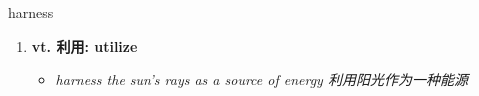 
\begin{frame}
{\huge harness}
\begin{center}
\begin{enumerate}\Large
  \item \textbf{vt. 利用: utilize}
  \begin{itemize}
    \item \em{\Large{harness the sun's rays as a source of energy 利用阳光作为一种能源}}
  \end{itemize}
\end{enumerate}
\end{center}
\end{frame}
